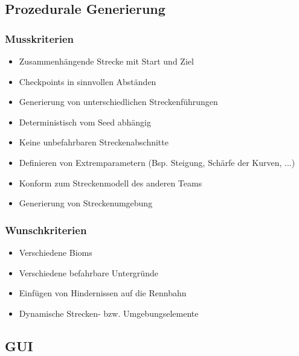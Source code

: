 \documentclass[parskip=full]{scrartcl}
\begin{document}
	\pagebreak
	
	\subsection{Prozedurale Generierung}
	\subsubsection{Musskriterien}
	\begin{itemize}
		\item Zusammenhängende Strecke mit Start und Ziel
		\item Checkpoints in sinnvollen Abständen
		\item Generierung von unterschiedlichen Streckenführungen
		\item Deterministisch vom \gls{Seed} abhängig
		\item Keine unbefahrbaren Streckenabschnitte
		\item Definieren von Extremparametern (Bsp. Steigung, Schärfe der Kurven, ...)
		\item Konform zum Streckenmodell des anderen Teams
		\item Generierung von Streckenumgebung
	\end{itemize}


	\subsubsection{Wunschkriterien}
	\begin{itemize}
		\item Verschiedene \glspl{Biom}
		\item Verschiedene befahrbare Untergründe
		\item Einfügen von Hindernissen auf die Rennbahn
		\item Dynamische Strecken- bzw. Umgebungselemente
	\end{itemize}
	
	\pagebreak
	
	\subsection{GUI}
\end{document}
